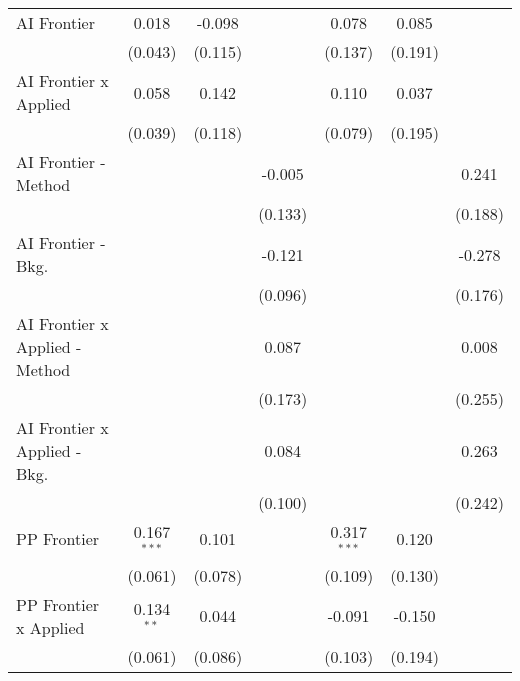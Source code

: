 \begin{tabular}{lcccccc}
   AI Frontier                    & 0.018         & -0.098       &                & 0.078         & 0.085       &   \\   
                                  & (0.043)       & (0.115)      &                & (0.137)       & (0.191)     &   \\   
   AI Frontier x Applied          & 0.058         & 0.142        &                & 0.110         & 0.037       &   \\   
                                  & (0.039)       & (0.118)      &                & (0.079)       & (0.195)     &   \\   
   AI Frontier - Method           &               &              & -0.005         &               &             & 0.241\\   
                                  &               &              & (0.133)        &               &             & (0.188)\\   
   AI Frontier - Bkg.             &               &              & -0.121         &               &             & -0.278\\   
                                  &               &              & (0.096)        &               &             & (0.176)\\   
   AI Frontier x Applied - Method &               &              & 0.087          &               &             & 0.008\\   
                                  &               &              & (0.173)        &               &             & (0.255)\\   
   AI Frontier x Applied - Bkg.   &               &              & 0.084          &               &             & 0.263\\   
                                  &               &              & (0.100)        &               &             & (0.242)\\   
   PP Frontier                    & 0.167$^{***}$ & 0.101        &                & 0.317$^{***}$ & 0.120       &   \\   
                                  & (0.061)       & (0.078)      &                & (0.109)       & (0.130)     &   \\   
   PP Frontier x Applied          & 0.134$^{**}$  & 0.044        &                & -0.091        & -0.150      &   \\   
                                  & (0.061)       & (0.086)      &                & (0.103)       & (0.194)     &   \\   

\end{tabular}
